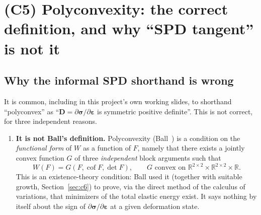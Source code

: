 \documentclass[10pt,a4paper]{article}
\newcommand{\Cof}{\operatorname{cof}}
\newcommand{\R}{\mathbb{R}}
\begin{document}
\section{(C5) Polyconvexity: the correct definition, and why ``SPD tangent'' is not it}
\label{sec:c5}

\subsection{Why the informal SPD shorthand is wrong}
\label{sec:c5-wrong}
It is common, including in this project's own working slides, to
shorthand ``polyconvex'' as ``$\bm D=\partial\bm\sigma/\partial
\bm\varepsilon$ is symmetric positive definite''. This is not correct, for
three independent reasons.

\begin{enumerate}
\item \textbf{It is not Ball's definition.} Polyconvexity
(Ball~\cite{Ball1977}) is a condition on the \emph{functional form} of
$W$ as a function of $F$, namely that there exists a jointly convex
function $G$ of three \emph{independent} block arguments such that
\begin{equation}
 W(F)=G(F,\Cof F,\det F),\qquad G\text{ convex on }\R^{2\times2}
 \times\R^{2\times2}\times\R.
 \label{eq:poly-def}
\end{equation}
This is an existence-theory condition: Ball used it (together with
suitable growth, Section~\ref{sec:c6}) to prove, via the direct method of
the calculus of variations, that minimizers of the total elastic energy
exist. It says nothing by itself about the sign of $\partial\bm\sigma/
\partial\bm\varepsilon$ at a given deformation state.


\end{enumerate}
\end{document}
